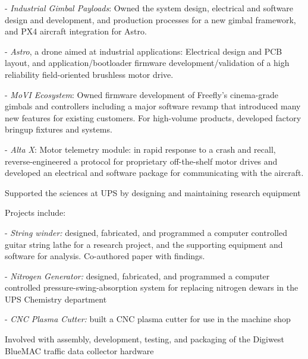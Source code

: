 \documentclass[letterpaper]{deedy-resume} %
\begin{document}
\begin{minipage}[t]{0.66\textwidth}
\begin{tightitemize}
- \textit{Industrial Gimbal Payloads}: Owned the system design, electrical and software design and development, and production processes for a new gimbal framework, and PX4 aircraft integration for Astro.

- \textit{Astro}, a drone aimed at industrial applications: Electrical design and PCB layout, and application/bootloader firmware development/validation of a high reliability field-oriented brushless motor drive. 

- \textit{MoVI Ecosystem}: Owned firmware development of Freefly's cinema-grade gimbals and controllers including a major software revamp that introduced many new features for existing customers.  For high-volume products, developed factory bringup fixtures and systems.

- \textit{Alta X}:  Motor telemetry module: in rapid response to a crash and recall, reverse-engineered a protocol for proprietary off-the-shelf motor drives and developed an electrical and software package for communicating with the aircraft.

\end{tightitemize}
\vspace{\topsep} %

\begin{tightitemize}
\item Supported the sciences at UPS by designing and maintaining research equipment
\item Projects include:

- \textit{String winder:} designed, fabricated, and programmed a computer controlled guitar string lathe for a research project, and the supporting equipment and software for analysis.  Co-authored paper with findings.

- \textit{Nitrogen Generator:} designed, fabricated, and programmed a computer controlled pressure-swing-absorption system for replacing nitrogen dewars in the UPS Chemistry department

- \textit{CNC Plasma Cutter:} built a CNC plasma cutter for use in the machine shop
\end{tightitemize}

\vspace{\topsep} %

\begin{tightitemize}
\item Involved with assembly, development, testing, and packaging of the Digiwest BlueMAC traffic data collector hardware


\end{tightitemize}
\end{minipage}
\end{document}
